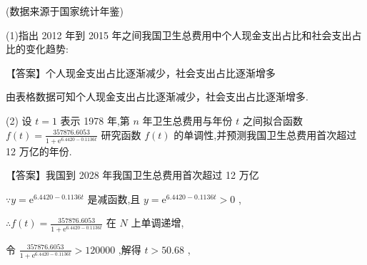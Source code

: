 \documentclass[10pt]{article}
\begin{document}
\begin{center}
\end{center}

(数据来源于国家统计年鉴)

(1)指出 2012 年到 2015 年之间我国卫生总费用中个人现金支出占比和社会支出占比的变化趋势:

【答案】个人现金支出占比逐渐减少，社会支出占比逐渐增多

由表格数据可知个人现金支出占比逐渐减少，社会支出占比逐渐增多.

(2) 设 \(t = 1\) 表示 1978 年,第 \(n\) 年卫生总费用与年份 \(t\) 之间拟合函数 \(f\left( t\right)  = \frac{357876.6053}{1 + {\mathrm{e}}^{{6.4420} - {0.1136t}}}\) 研究函数 \(f\left( t\right)\) 的单调性,并预测我国卫生总费用首次超过 12 万亿的年份.

【答案】我国到 2028 年我国卫生总费用首次超过 12 万亿

\(\because y = {\mathrm{e}}^{{6.4420} - {0.1136t}}\) 是减函数,且 \(y = {\mathrm{e}}^{{6.4420} - {0.1136t}} > 0\) ,

\(\therefore f\left( t\right)  = \frac{357876.6053}{1 + {\mathrm{e}}^{{6.4420} - {0.1136t}}}\) 在 \(N\) 上单调递增,

令 \(\frac{357876.6053}{1 + {\mathrm{e}}^{{6.4420} - {0.1136t}}} > {120000}\) ,解得 \(t > {50.68}\) ,
\end{document}
